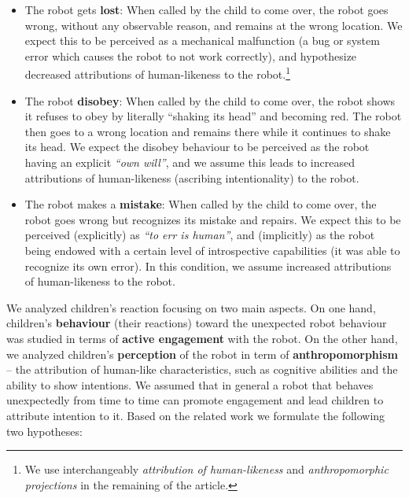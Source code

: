 \documentclass{sig-alternate}
\begin{document}
\begin{itemize}

    \item The robot gets \textbf{lost}: When called by the child to come over,
        the robot goes wrong, without any observable reason, and remains at the
        wrong location. We expect this to be perceived as a mechanical
        malfunction (a bug or system error which causes the robot to not work
        correctly), and hypothesize decreased attributions of human-likeness to
        the robot.\footnote{We use interchangeably \textit{attribution of
            human-likeness} and \textit{anthropomorphic projections} in the
        remaining of the article.} 

    \item The robot \textbf{disobey}: When called by the child to come over, the
        robot shows it refuses to obey by literally ``shaking its head'' and
        becoming red. The robot then goes to a wrong location and remains there
        while it continues to shake its head. We expect the disobey behaviour to
        be perceived as the robot having an explicit \textit{``own will''}, and
        we assume this leads to increased attributions of human-likeness
        (ascribing intentionality) to the robot.

    \item The robot makes a \textbf{mistake}: When called by the child to come
        over, the robot goes wrong but recognizes its mistake and repairs. We
        expect this to be perceived (explicitly) as \textit{``to err is
        human''}, and (implicitly) as the robot being endowed with a certain
        level of introspective capabilities (it was able to recognize its own
        error). In this condition, we assume increased attributions of
        human-likeness to the robot.

\end{itemize}

We analyzed children's reaction focusing on two main aspects. On one hand,
children's \textbf{behaviour} (their reactions) toward the unexpected robot
behaviour was studied in terms of \textbf{active engagement} with the robot. On
the other hand, we analyzed children's \textbf{perception} of the robot in term
of \textbf{anthropomorphism} -- the attribution of human-like characteristics,
such as cognitive abilities and the ability to show intentions. We assumed that
in general a robot that behaves unexpectedly from time to time can promote
engagement and lead children to attribute intention to it. Based
on the related work we formulate the following two hypotheses:
\end{document}
